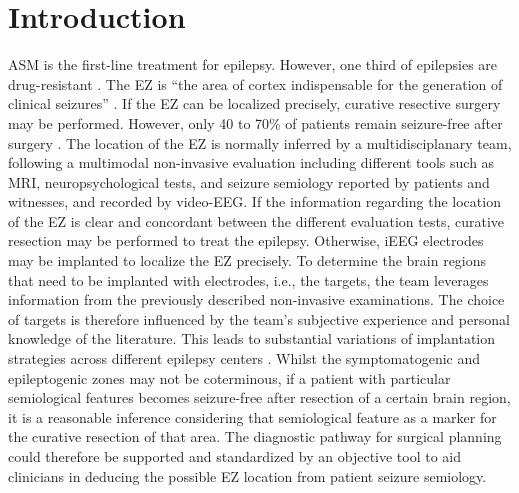 \section{Introduction}

\Ac{ASM} is the first-line treatment for epilepsy.
However, one third of epilepsies are drug-resistant \cite{engel_what_2016}.
The \ac{EZ} is ``the area of cortex indispensable for the generation of clinical seizures'' \cite{rosenow_presurgical_2001}.
If the \ac{EZ} can be localized precisely, curative resective surgery may be performed.
However, only 40 to 70\% of patients remain seizure-free after surgery \cite{jobst_resective_2015}.
The location of the \ac{EZ} is normally inferred by a multidisciplanary team, following a multimodal non-invasive evaluation including different tools such as \ac{MRI}, neuropsychological tests, and seizure semiology reported by patients and witnesses, and recorded by video-\ac{EEG}.
If the information regarding the location of the \ac{EZ} is clear and concordant between the different evaluation tests, curative resection may be performed to treat the epilepsy.
Otherwise, \ac{iEEG} electrodes may be implanted to localize the \ac{EZ} precisely.
To determine the brain regions that need to be implanted with electrodes, i.e., the targets, the team leverages information from the previously described non-invasive examinations.
The choice of targets is therefore influenced by the team's subjective experience and personal knowledge of the literature.
This leads to substantial variations of implantation strategies across different epilepsy centers \cite{tufenkjian_seizure_2012}.
Whilst the symptomatogenic and epileptogenic zones may not be coterminous, if a patient with particular semiological features becomes seizure-free after resection of a certain brain region, it is a reasonable inference considering that semiological feature as a marker for the curative resection of that area.
The diagnostic pathway for surgical planning could therefore be supported and standardized by an objective tool to aid clinicians in deducing the possible \ac{EZ} location from patient seizure semiology.

